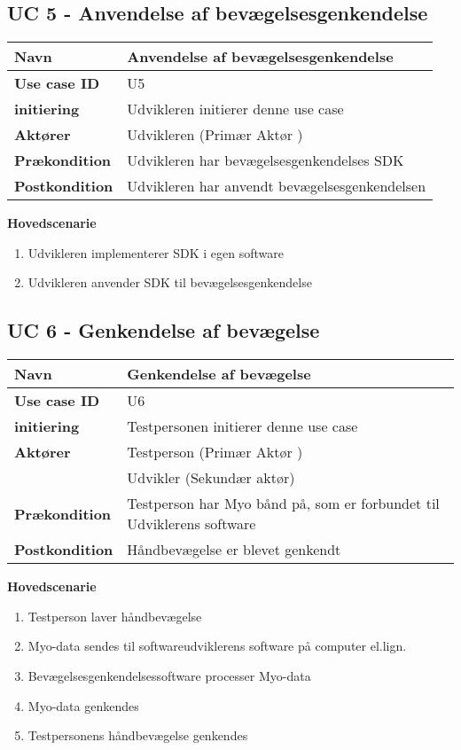 \subsection{UC 5 - Anvendelse af bevægelsesgenkendelse}
\begin{table}[htbp] 
	\begin{tabular}{|p{5cm}|p{9cm}|}
		\hline
		\textbf{Navn} & Anvendelse af bevægelsesgenkendelse \\ \hline
		\textbf{Use case ID} & U5 \\ \hline
		\textbf{initiering} & Udvikleren initierer denne use case \\ \hline
		\textbf{Aktører} & Udvikleren (Primær Aktør ) \\ \hline
		\textbf{Prækondition} & Udvikleren har bevægelsesgenkendelses SDK\\ \hline
		\textbf{Postkondition} & Udvikleren har anvendt bevægelsesgenkendelsen\\ \hline
	\end{tabular}
\end{table}
\textbf{Hovedscenarie}
\begin{enumerate}
	\item Udvikleren implementerer SDK i egen software
	\item Udvikleren anvender SDK til bevægelsesgenkendelse
\end{enumerate}

\newpage
\subsection{UC 6 - Genkendelse af bevægelse}
\begin{table}[htbp] 
	\begin{tabular}{|p{5cm}|p{9cm}|}
		\hline
		\textbf{Navn} & Genkendelse af bevægelse  \\ \hline
		\textbf{Use case ID} & U6 \\ \hline
		\textbf{initiering} & Testpersonen initierer denne use case \\ \hline
		\textbf{Aktører} & Testperson (Primær Aktør )\\ & Udvikler (Sekundær aktør) \\ \hline
		\textbf{Prækondition} & Testperson har Myo bånd på, som er forbundet til Udviklerens software \\ \hline
		\textbf{Postkondition} & Håndbevægelse er blevet genkendt\\ \hline
	\end{tabular}
\end{table}
\textbf{Hovedscenarie}
\begin{enumerate}
	\item Testperson laver håndbevægelse
	\item Myo-data sendes til softwareudviklerens software på computer el.lign.
	\item Bevægelsesgenkendelsessoftware processer Myo-data
	\item Myo-data genkendes
	\item Testpersonens håndbevægelse genkendes
\end{enumerate}